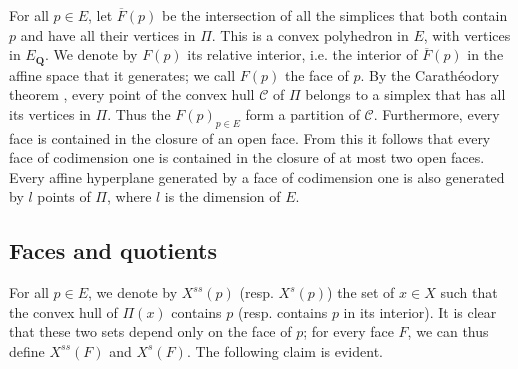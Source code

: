 \documentclass{article}
\newcommand{\QQ}{\mathbf{Q}}
\begin{document}
For all $p\in E$, let $\overline{F}(p)$ be the intersection of all the simplices that both contain $p$ and have all their vertices in $\Pi$.
This is a convex polyhedron in $E$, with vertices in $E_\QQ$.
We denote by $F(p)$ its relative interior, i.e. the interior of $\overline{F}(p)$ in the affine space that it generates;
we call $F(p)$ the face of $p$.
By the Carath\'{e}odory theorem \cite[Theorem~1.21]{Val}, every point of the convex hull $\mathcal{C}$ of $\Pi$ belongs to a simplex that has all its vertices in $\Pi$.
Thus the $F(p)_{p\in E}$ form a partition of $\mathcal{C}$.
Furthermore, every face is contained in the closure of an open face.
From this it follows that every face of codimension one is contained in the closure of at most two open faces.
Every affine hyperplane generated by a face of codimension one is also generated by $l$ points of $\Pi$, where $l$ is the dimension of $E$.


\subsection{Faces and quotients}
\label{1.2}

For all $p\in E$, we denote by $X^{ss}(p)$ (resp. $X^s(p)$) the set of $x\in X$ such that the convex hull of $\Pi(x)$ contains $p$ (resp. contains $p$ in its interior).
It is clear that these two sets depend only on the face of $p$;
for every face $F$, we can thus define $X^{ss}(F)$ and $X^s(F)$.
The following claim is evident.



\nocite{*}
\end{document}
